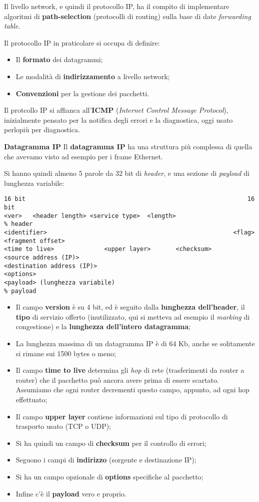 \documentclass[a4paper,11pt]{article}
\begin{document}
Il livello network, e quindi il protocollo IP, ha il compito di implementare algoritmi di \textbf{path-selection} (protocolli di routing) sulla base di date \textit{forwarding table}.

Il protocollo IP in praticolare si occupa di definire:
\begin{itemize}
	\item Il \textbf{formato} dei datagrammi;
	\item Le modalità di \textbf{indirizzamento} a livello network;
	\item \textbf{Convenzioni} per la gestione dei pacchetti.
\end{itemize}

Il protcollo IP si affianca all'\textbf{ICMP} (\textit{Internet Control Message Protocol}), inizialmente pensato per la notifica degli errori e la diagnostica, oggi usato perlopiù per diagnostica.

\textbf{Datagramma IP}
Il \textbf{datagramma IP} ha una struttura più complessa di quella che avevamo visto ad esempio per i frame Ethernet.

Si hanno quindi almeno 5 parole da 32 bit di \textit{header}, e una sezione di \textit{payload} di lunghezza variabile: 
\begin{lstlisting}[style=codestyle]	
16 bit																16 bit
<ver>	<header length>	<service type>	<length>									% header
<identifier>													<flag>	<fragment offset>
<time to live>				<upper layer>		<checksum>
<source address (IP)>
<destination address (IP)>
<options>
<payload> (lunghezza variabile)																	% payload
\end{lstlisting}

\begin{itemize}
	\item Il campo \textbf{version} è su 4 bit, ed è seguito dalla \textbf{lunghezza dell'header}, il \textbf{tipo} di servizio offerto (inutilizzato, qui si metteva ad esempio il \textit{marking} di congestione) e la \textbf{lunghezza dell'intero datagramma};
	\item La lunghezza massima di un datagramma IP è di 64 Kb, anche se solitamente si rimane sui 1500 bytes o meno;
	\item Il campo \textbf{time to live} determina gli \textit{hop} di rete (trasferimenti da router a router) che il pacchetto può ancora avere prima di essere scartato. Assumiamo che ogni router decrementi questo campo, appunto, ad ogni hop effettuato;
	\item Il campo \textbf{upper layer} contiene informazioni sul tipo di protocollo di trasporto usato (TCP o UDP);
	\item Si ha quindi un campo di \textbf{checksum} per il controllo di errori;
	\item Seguono i campi di \textbf{indirizzo} (sorgente e destinazione IP);
	\item Si ha un campo opzionale di \textbf{options} specifiche al pacchetto;
	\item Infine c'è il \textbf{payload} vero e proprio.
\end{itemize}
\end{document}
